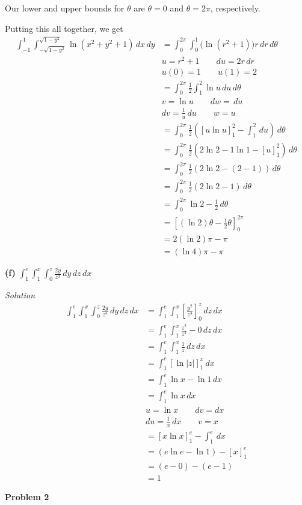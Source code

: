 \documentclass{article}
\newcommand{\lrp}[1]{\left( #1 \right)}
\newcommand{\lrb}[1]{\left[ #1 \right]}
\newcommand{\Solution}{\textit{Solution}}
\begin{document}
Our lower and upper bounds for $\theta$ are $\theta=0$ and $\theta =2\pi$, respectively.

Putting this all together, we get
\begin{align*}
    \int_{-1}^1\int_{-\sqrt{1-y^2}}^{\sqrt{1-y^2}}\ln (x^2+y^2+1)\,dx\,dy&=\int_0^{2\pi}\int_0^1 \big(\ln (r^2+1)\big)r\,dr\,d\theta\tag{don't forget extra $r$; $x^2+y^2=r^2$}\\
    &u=r^2 +1\hspace{2em} du=2r\,dr\\
    &u(0)=1\hspace{2em} u(1) = 2\\
    &=\int_0^{2\pi}\frac{1}{2}\int_1^2 \ln u\,du\,d\theta\\
    &v=\ln u\hspace{2em}dw=\,du\\
    &dv=\frac{1}{u}\,du\hspace{2em}w=u\\
    &=\int_0^{2\pi}\frac{1}{2}\lrp{\lrb{u\ln u}_1^2-\int_1^2 \,du}\,d\theta\\
    &=\int_0^{2\pi}\frac{1}{2}\lrp{2\ln 2 - 1\ln 1 - \lrb{u}_1^2}\,d\theta\\
    &=\int_0^{2\pi}\frac{1}{2}\lrp{2\ln 2 - (2-1)}\,d\theta\\
    &=\int_0^{2\pi}\frac{1}{2}\lrp{2\ln 2-1}\,d\theta\\
    &=\int_0^{2\pi} \ln 2 -\frac{1}{2}\,d\theta\\
    &=\lrb{(\ln 2)\theta -\frac{1}{2}\theta}_0^{2\pi}\\
    &=2(\ln 2) \pi - \pi\\
    &=\boxed{(\ln 4) \pi-\pi}\tag{$2\ln 2=\ln 2^2=\ln 4$}
\end{align*}
{}
\textbf{(f)} $\displaystyle \int_1^e\int_1^x\int_0^z\frac{2y}{z^3}\,dy\,dz\,dx$

\Solution
\begin{align*}
    \int_1^e\int_1^x\int_0^z\frac{2y}{z^3}\,dy\,dz\,dx&=\int_1^e\int_1^x \lrb{\frac{y^2}{z^3}}_0^z\,dz\,dx\\
    &=\int_1^e\int_1^x \frac{z^2}{z^3}-0\,dz\,dx\\
    &=\int_1^e\int_1^x \frac{1}{z}\,dz\,dx\\
    &=\int_1^e \lrb{\ln \left|z\right|}_1^x\,dx\\
    &=\int_1^e \ln x - \ln 1\,dx\tag{ok to drop abs since $1\leq x\leq e$}\\
    &=\int_1^e \ln x\,dx\\
    &u=\ln x\hspace{2em}dv=dx\\
    &du=\frac{1}{x}\,dx\hspace{2em}v=x\\
    &=\lrb{x\ln x}_1^e -\int_1^e \,dx\\
    &=\lrp{e\ln e - \ln 1}-\lrb{x}_1^e\\
    &= \lrp{e - 0}-\lrp{e-1}\\
    &=\boxed{ 1}
\end{align*}
{}\textbf{Problem 2} 
\end{document}
